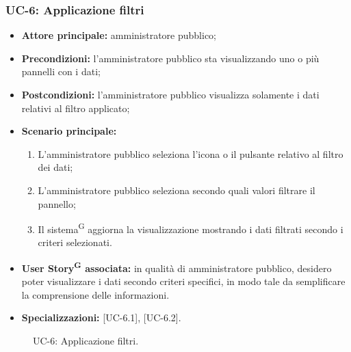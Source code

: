 \documentclass[8pt]{article}
\newcommand{\glossterm}[1]{#1\textsuperscript{G}} %
\begin{document}
\subsubsection*{UC-6: Applicazione filtri}
\begin{itemize}
    \item \textbf{Attore principale:} amministratore pubblico;
    \item \textbf{Precondizioni:} l’amministratore pubblico sta visualizzando uno o più pannelli con i dati;
    \item \textbf{Postcondizioni:} l’amministratore pubblico visualizza solamente i dati relativi al filtro
applicato;
    \item \textbf{Scenario principale:}
        \begin{enumerate}
        \item L’amministratore pubblico seleziona l’icona o il pulsante relativo al filtro dei dati;
        \item L’amministratore pubblico seleziona secondo quali valori filtrare il pannello;
        \item Il \glossterm{sistema} aggiorna la visualizzazione mostrando i dati filtrati secondo i criteri selezionati.
        \end{enumerate}
    \item \textbf{\glossterm{User Story} associata:} in qualità di amministratore pubblico, desidero poter
        visualizzare i dati secondo criteri specifici, in modo tale da semplificare la comprensione
        delle informazioni.
    \item \textbf{Specializzazioni:} [UC-6.1], [UC-6.2].
\end{itemize}
\begin{figure}[ht!]
    \centering
    \caption{UC-6: Applicazione filtri.}
    \label{fig:UC-6: Applicazione filtri}
\end{figure}
\end{document}
